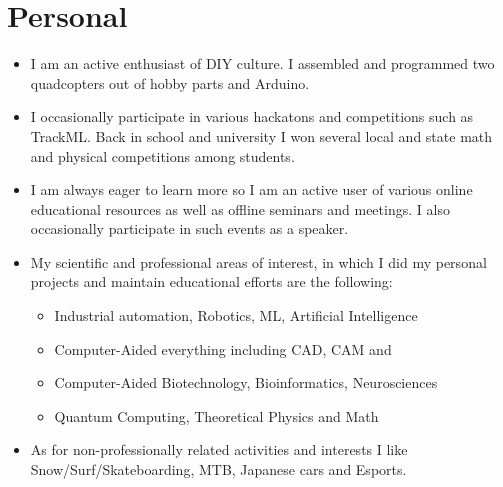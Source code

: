 \documentclass[a4paper,10pt]{article}
\begin{document}
\begin{adjustbox}{valign=t}
\begin{minipage}{0.6\textwidth}
\section*{Personal}
\begin{itemize}[noitemsep]
	\item I am an active enthusiast of DIY culture. I assembled and programmed two quadcopters out of hobby parts 
		and Arduino.
	\item I occasionally participate in various hackatons and competitions such as TrackML. Back in school and 
		university I won several local and state math and physical competitions among students.
	\item I am always eager to learn more so I am an active user of various online educational resources as well 
		as offline seminars and meetings. I also occasionally participate in such events as a speaker.
	\item My scientific and professional areas of interest, in which I did my personal projects and 
		maintain educational efforts are the following:
	\begin{itemize}[noitemsep]
        \item Industrial automation, Robotics, ML, Artificial Intelligence
        \item Computer-Aided everything including CAD, CAM and 
		\item Computer-Aided Biotechnology, Bioinformatics, Neurosciences
		\item Quantum Computing, Theoretical Physics and Math
	\end{itemize}
	\item As for non-professionally related activities and interests 
	I like Snow/Surf/Skateboarding, MTB, Japanese cars and Esports.
\end{itemize}

\end{minipage}
\end{adjustbox}
\end{document}
